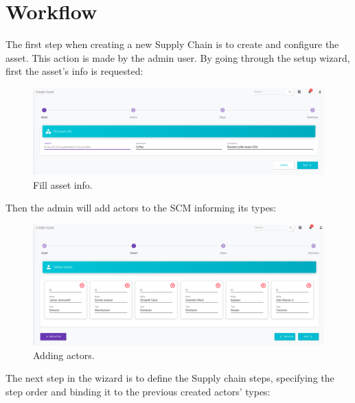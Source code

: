\section{Workflow}\label{sec:workflow}

The first step when creating a new Supply Chain  is to create and configure the asset. This action is made by the admin user. By going through the setup wizard, first the asset's info is requested:

\begin{figure}[H]
\begin{center}
  \includegraphics[scale=0.27]{images/use_example/01_create_asset_1.png}
\caption{Fill asset info.}
\label{fig:create_asset_1}
\end{center}
\end{figure}

Then the admin will add actors to the SCM informing its types:

\begin{figure}[H]
\begin{center}
  \includegraphics[scale=0.27]{images/use_example/02_create_asset_2.png}
\caption{Adding actors.}
\label{fig:create_asset_2}
\end{center}
\end{figure}


The next step in the wizard is to define the Supply chain steps, specifying the step order and binding it to the previous created actors' types:


